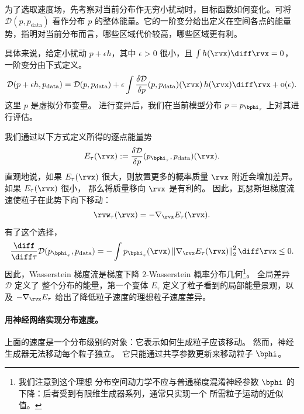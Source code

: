 为了选取速度场，先考察对当前分布作无穷小扰动时，目标函数如何变化。可将 $\mathcal{D}(p,p_{\mathrm{data}})$ 看作分布 $p$ 的整体能量。它的一阶变分给出定义在空间各点的能量势，指明对当前分布而言，哪些区域代价较高，哪些区域更有利。

具体来说，给定小扰动 $p+\epsilon h$，其中 $\epsilon>0$ 很小，且 $\int h(\rvx)\diff\rvx=0$，一阶变分由下式定义。
\[
    \mathcal{D}(p+\epsilon h,p_{\mathrm{data}})
    =
    \mathcal{D}(p,p_{\mathrm{data}})
    +
    \epsilon
    \int
    \frac{\delta\mathcal{D}}{\delta p}
    (p,p_{\mathrm{data}})(\rvx)\,
    h(\rvx)\diff\rvx
    +
    \mathop{\mathrm{o}}(\epsilon).
\]
这里 $p$ 是虚拟分布变量。  进行变异后，我们在当前模型分布 $p=p_{\bphi_\tau}$ 上对其进行评估。

我们通过以下方式定义所得的逐点能量势
\[
    E_\tau(\rvx)
    :=
    \frac{\delta\mathcal{D}}{\delta p}
    (p_{\bphi_\tau},p_{\mathrm{data}})(\rvx).
\]
直观地说，如果 $E_\tau(\rvx)$ 很大，则放置更多的概率质量
$\rvx$ 附近会增加差异。  如果 $E_\tau(\rvx)$ 很小，
那么将质量移向 $\rvx$ 是有利的。  因此，瓦瑟斯坦梯度流速使粒子在此势下向下移动：
\[
    \rvw_\tau(\rvx)
    =
    -
    \nabla_{\rvx}E_\tau(\rvx).
\]
有了这个选择，
\[
    \frac{\diff}{\diff \tau}
    \mathcal{D}(p_{\bphi_\tau},p_{\mathrm{data}})
    =
    -
    \int
    p_{\bphi_\tau}(\rvx)
    \left\|
        \nabla_{\rvx}E_\tau(\rvx)
    \right\|_2^2
    \diff\rvx
    \le 0.
\]
因此，Wasserstein 梯度流是梯度下降
$2$-Wasserstein 概率分布几何\footnote{我们注意到这个理想
分布空间动力学不应与普通梯度混淆神经参数 $\bphi$ 的下降：后者受到有限维生成器系列，通常只实现一个
所需粒子运动的近似值。}。  全局差异 $\mathcal{D}$ 定义了
整个分布的能量，第一个变体 $E_\tau$ 定义了粒子看到的局部能量景观，以及
$-\nabla_{\rvx}E_\tau$ 给出了降低粒子速度的理想粒子速度差异。

\paragraph{用神经网络实现分布速度。}
上面的速度是一个分布级别的对象：它表示如何生成粒子应该移动。  然而，神经生成器无法移动每个粒子独立。  它只能通过共享参数更新来移动粒子
$\bphi$。

